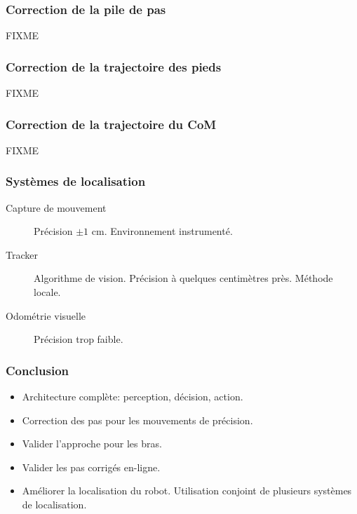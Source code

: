 \documentclass[14pt,utf8x,hyperref={pdfpagelabels=false}]{beamer}
\begin{document}
\begin{slideAction}
  \frametitle{Correction de la pile de pas}

  FIXME
\end{slideAction}

\begin{slideAction}
  \frametitle{Correction de la trajectoire des pieds}

  FIXME
\end{slideAction}

\begin{slideAction}
  \frametitle{Correction de la trajectoire du CoM}

  FIXME
\end{slideAction}




\begin{slidePerception}
  \frametitle{Systèmes de localisation}

  \begin{changeleftmargin}{1.1cm}
  \begin{description}
  \item[Capture de mouvement] Précision $\pm 1$ cm. Environnement
    instrumenté.
  \item[Tracker] Algorithme de vision. Précision à quelques
    centimètres près. Méthode locale.
  \item[Odométrie visuelle] Précision trop faible.
  \end{description}
  \end{changeleftmargin}
\end{slidePerception}


\begin{frame}
  \frametitle{Conclusion}

  \begin{itemize}
  \item Architecture complète: perception, décision, action.
  \item Correction des pas pour les mouvements de précision.
  \end{itemize}

  \bigskip

  \begin{itemize}
  \item Valider l'approche pour les bras.
  \item Valider les pas corrigés en-ligne.
  \item Améliorer la localisation du robot. Utilisation conjoint de
    plusieurs systèmes de localisation.
  \end{itemize}
\end{frame}
\end{document}
